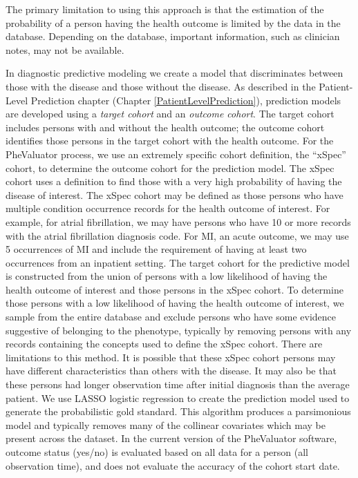 \documentclass[11pt]{book}
\theoremstyle{definition}
\theoremstyle{definition}
\theoremstyle{definition}
\theoremstyle{remark}
\begin{document}
The primary limitation to using this approach is that the estimation of
the probability of a person having the health outcome is limited by the
data in the database. Depending on the database, important information,
such as clinician notes, may not be available.

In diagnostic predictive modeling we create a model that discriminates
between those with the disease and those without the disease. As
described in the Patient-Level Prediction chapter (Chapter
\ref{PatientLevelPrediction}), prediction models are developed using a
\emph{target cohort} and an \emph{outcome cohort}. The target cohort
includes persons with and without the health outcome; the outcome cohort
identifies those persons in the target cohort with the health outcome.
For the PheValuator process, we use an extremely specific cohort
definition, the ``xSpec'' cohort, to determine the outcome cohort for
the prediction model. The xSpec cohort uses a definition to find those
with a very high probability of having the disease of interest. The
xSpec cohort may be defined as those persons who have multiple condition
occurrence records for the health outcome of interest. For example, for
atrial fibrillation, we may have persons who have 10 or more records
with the atrial fibrillation diagnosis code. For MI, an acute outcome,
we may use 5 occurrences of MI and include the requirement of having at
least two occurrences from an inpatient setting. The target cohort for
the predictive model is constructed from the union of persons with a low
likelihood of having the health outcome of interest and those persons in
the xSpec cohort. To determine those persons with a low likelihood of
having the health outcome of interest, we sample from the entire
database and exclude persons who have some evidence suggestive of
belonging to the phenotype, typically by removing persons with any
records containing the concepts used to define the xSpec cohort. There
are limitations to this method. It is possible that these xSpec cohort
persons may have different characteristics than others with the disease.
It may also be that these persons had longer observation time after
initial diagnosis than the average patient. We use LASSO logistic
regression to create the prediction model used to generate the
probabilistic gold standard. \citep{suchard_2013} This algorithm
produces a parsimonious model and typically removes many of the
collinear covariates which may be present across the dataset. In the
current version of the PheValuator software, outcome status (yes/no) is
evaluated based on all data for a person (all observation time), and
does not evaluate the accuracy of the cohort start date.
\end{document}
